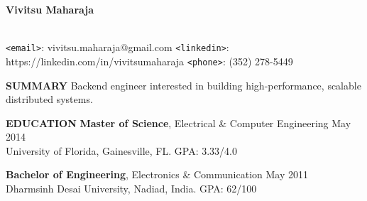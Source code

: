\documentclass[10pt, letterpaper]{article}
\begin{document}
\begin{center}
\textbf{\Large Vivitsu Maharaja}
\date{}
\thispagestyle{empty}
\smallskip \\
\texttt{<email>}: vivitsu.maharaja@gmail.com \texttt{<linkedin>}: https://linkedin.com/in/vivitsumaharaja \texttt{<phone>}: (352) 278-5449
\end{center}

\textbf{SUMMARY}
\smallskip
\newline
Backend engineer interested in building high-performance, scalable distributed systems.
%

\textbf{EDUCATION}
\smallskip
\newline
{\bf Master of Science}, Electrical \& Computer Engineering \hfill May 2014\\
University of Florida, Gainesville, FL. \hfill GPA: 3.33/4.0

{\bf Bachelor of Engineering}, Electronics \& Communication \hfill May 2011\\
Dharmsinh Desai University, Nadiad, India. \hfill GPA: 62/100
\end{document}
